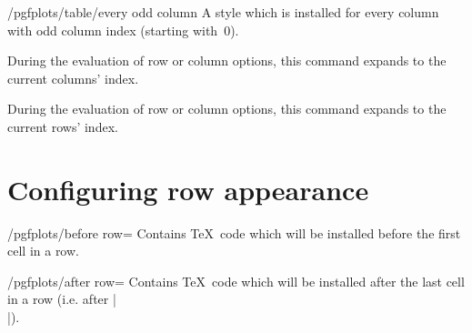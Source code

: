 \begin{stylekey}{/pgfplots/table/every odd column}
A style which is installed for every column with odd column index (starting with~$0$).
\end{stylekey}

\begin{command}{\pgfplotstablecol}
	During the evaluation of row or column options, this command expands to the current columns' index.
\end{command}
\begin{command}{\pgfplotstablerow}
	During the evaluation of row or column options, this command expands to the current rows' index.
\end{command}


\section{Configuring row appearance}
\begin{key}{/pgfplots/before row=}	
	Contains \TeX\ code which will be installed before the first cell in a row.
\end{key}

\begin{key}{/pgfplots/after row=}	
	Contains \TeX\ code which will be installed after the last cell in a row (i.e. after |\\|).
\end{key}


